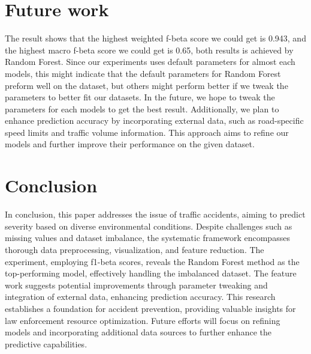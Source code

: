 \documentclass[10pt,twocolumn,letterpaper]{article}
\begin{document}
\begin{CJK}{UTF8}{bsmi}
\section{Future work}
The result shows that the highest weighted f-beta score we could get is 0.943, and the highest macro f-beta score we could get is 0.65, both results is achieved by Random Forest. Since our experiments uses default parameters for almost each models, this might indicate that the default parameters for Random Forest preform well on the dataset, but others might perform better if we tweak the parameters to better fit our datasets. In the future, we hope to tweak the parameters for each models to get the best result. Additionally, we plan to enhance prediction accuracy by incorporating external data, such as road-specific speed limits and traffic volume information. This approach aims to refine our models and further improve their performance on the given dataset.

\section{Conclusion}
In conclusion, this paper addresses the issue of traffic accidents, aiming to predict severity based on diverse environmental conditions. Despite challenges such as missing values and dataset imbalance, the systematic framework encompasses thorough data preprocessing, visualization, and feature reduction. The experiment, employing f1-beta scores, reveals the Random Forest method as the top-performing model, effectively handling the imbalanced dataset. The feature work suggests potential improvements through parameter tweaking and integration of external data, enhancing prediction accuracy. This research establishes a foundation for accident prevention, providing valuable insights for law enforcement resource optimization. Future efforts will focus on refining models and incorporating additional data sources to further enhance the predictive capabilities.

{\small


}

\end{CJK}
\end{document}
